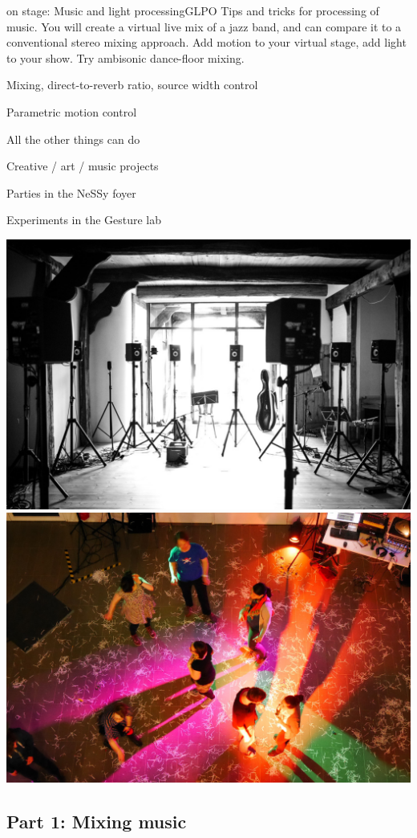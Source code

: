 \documentclass[11pt,a4paper,twoside]{article}
\begin{document}
\setcounter{tutorial}{6}
\begin{tutorial}{\tascar{} on stage: Music and light processing}{GLPO}
Tips and tricks for processing of music. You will create a virtual
live mix of a jazz band, and can compare it to a conventional stereo
mixing approach. Add motion to your virtual stage, add light to your
show. Try ambisonic dance-floor mixing.

\begin{learnitems}
\item Mixing, direct-to-reverb ratio, source width control
\item Parametric motion control
\item All the other things \tascar{} can do
\end{learnitems}

\begin{appitems}
\item Creative / art / music projects
\item Parties in the NeSSy foyer
\item Experiments in the Gesture lab
\end{appitems}

\medskip

\centerline{
\includegraphics[width=0.45\columnwidth]{tascaronstage1.jpg}
\hskip8mm
\includegraphics[width=0.45\columnwidth]{tascaronstage2.jpg}
}
\end{tutorial}

\ifshowtutorial

\newpage

\subsection*{Part 1: Mixing music}
\end{document}
